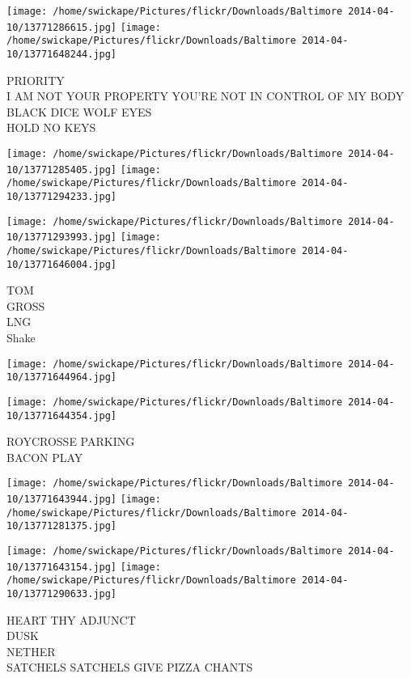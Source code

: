\documentclass[10pt,letterpaper]{article}
\begin{document}
\texttt{[image: /home/swickape/Pictures/flickr/Downloads/Baltimore 2014-04-10/13771286615.jpg]}
\texttt{[image: /home/swickape/Pictures/flickr/Downloads/Baltimore 2014-04-10/13771648244.jpg]}

PRIORITY\\
I AM NOT YOUR PROPERTY YOU'RE NOT IN CONTROL OF MY BODY\\
BLACK DICE WOLF EYES\\
HOLD NO KEYS\\
\pagebreak

\texttt{[image: /home/swickape/Pictures/flickr/Downloads/Baltimore 2014-04-10/13771285405.jpg]}
\texttt{[image: /home/swickape/Pictures/flickr/Downloads/Baltimore 2014-04-10/13771294233.jpg]}

\texttt{[image: /home/swickape/Pictures/flickr/Downloads/Baltimore 2014-04-10/13771293993.jpg]}
\texttt{[image: /home/swickape/Pictures/flickr/Downloads/Baltimore 2014-04-10/13771646004.jpg]}

TOM\\
GROSS\\
LNG\\
Shake\\
\pagebreak

\texttt{[image: /home/swickape/Pictures/flickr/Downloads/Baltimore 2014-04-10/13771644964.jpg]}

\vspace{0.25in}
\texttt{[image: /home/swickape/Pictures/flickr/Downloads/Baltimore 2014-04-10/13771644354.jpg]}

ROYCROSSE PARKING\\
BACON PLAY\\
\pagebreak

\texttt{[image: /home/swickape/Pictures/flickr/Downloads/Baltimore 2014-04-10/13771643944.jpg]}
\texttt{[image: /home/swickape/Pictures/flickr/Downloads/Baltimore 2014-04-10/13771281375.jpg]}

\texttt{[image: /home/swickape/Pictures/flickr/Downloads/Baltimore 2014-04-10/13771643154.jpg]}
\texttt{[image: /home/swickape/Pictures/flickr/Downloads/Baltimore 2014-04-10/13771290633.jpg]}

HEART THY ADJUNCT\\
DUSK\\
NETHER\\
SATCHELS SATCHELS GIVE PIZZA CHANTS\\
\pagebreak
\end{document}
